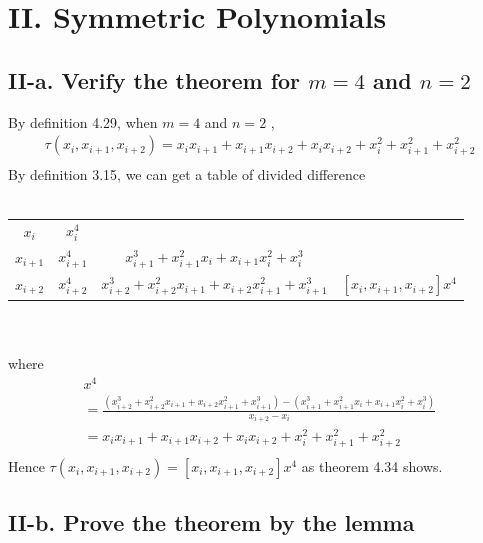 \documentclass[twoside,a4paper]{article}
\begin{document}
\section*{II. Symmetric Polynomials}
\subsection*{II-a. Verify the theorem for $m=4$ and $n=2$} 
By definition 4.29, when $m=4$ and $n=2$ , 
\begin{gather}
\tau(x_{i},x_{i+1},x_{i+2})=x_{i}x_{i+1}+x_{i+1}x_{i+2}+x_{i}x_{i+2}+x_{i}^2+x_{i+1}^2+x_{i+2}^2\\
\end{gather}
By definition 3.15, we can get a table of divided difference\\ \\
\begin{tabular}{c|ccc}
$x_i$ & $x_i^4$\\
$x_{i+1}$ & $x_{i+1}^4$ & $x_{i+1}^3+x_{i+1}^2x_{i}+x_{i+1}x_i^2+x_i^3$\\
$x_{i+2}$ & $x_{i+2}^4$ & $x_{i+2}^3+x_{i+2}^2x_{i+1}+x_{i+2}x_{i+1}^2+x_{i+1}^3$ & $[x_i,x_{i+1},x_{i+2}]x^4$
\end{tabular}
\\ 
\\
where 
\begin{gather}
[x_i,x_{i+1},x_{i+2}]x^4\\ 
=\frac{(x_{i+2}^3+x_{i+2}^2x_{i+1}+x_{i+2}x_{i+1}^2+x_{i+1}^3)-(x_{i+1}^3+x_{i+1}^2x_{i}+x_{i+1}x_i^2+x_i^3)}{x_{i+2}-x_i}\\
=x_{i}x_{i+1}+x_{i+1}x_{i+2}+x_{i}x_{i+2}+x_{i}^2+x_{i+1}^2+x_{i+2}^2 \\
\end{gather}
Hence $\tau(x_{i},x_{i+1},x_{i+2})=[x_i,x_{i+1},x_{i+2}]x^4$ as theorem 4.34 shows.
\subsection*{II-b. Prove the theorem by the lemma} 
\end{document}
